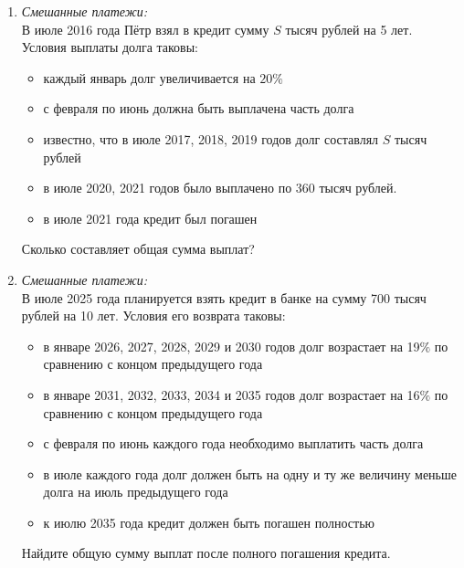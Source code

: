 \documentclass[12pt]{article}
\begin{document}
\begin{enumerate}[start=1,label={\itshape\bfseries \arabic*.}]
    \item \emph{Смешанные платежи:}\\
    В июле 2016 года Пётр взял в кредит сумму $S$ тысяч рублей на 5 лет. Условия выплаты долга таковы:
    \begin{itemize}
        \item каждый январь долг увеличивается на $20\%$
        \item с февраля по июнь должна быть выплачена часть долга
        \item известно, что в июле 2017, 2018,  2019 годов долг составлял $S$ тысяч рублей
        \item в июле 2020, 2021 годов было выплачено по 360 тысяч рублей.
        \item в июле 2021 года кредит был погашен
    \end{itemize}
    Сколько составляет общая сумма выплат?
    \item \emph{Смешанные платежи:}\\
    В июле 2025 года планируется взять кредит в банке на сумму 700 тысяч рублей на 10 лет. Условия его возврата таковы:
    \begin{itemize}
        \item в январе 2026, 2027, 2028, 2029 и 2030 годов долг возрастает на 19$\%$ по сравнению с концом предыдущего года
        \item в январе 2031, 2032, 2033, 2034 и 2035 годов долг возрастает на 16$\%$ по сравнению с концом предыдущего года
        \item с февраля по июнь каждого года необходимо выплатить часть долга
        \item в июле каждого года долг должен быть на одну и ту же величину меньше долга на июль предыдущего года
        \item к июлю 2035 года кредит должен быть погашен полностью
    \end{itemize}
    Найдите общую сумму выплат после полного погашения кредита.
\end{enumerate}
\end{document}
